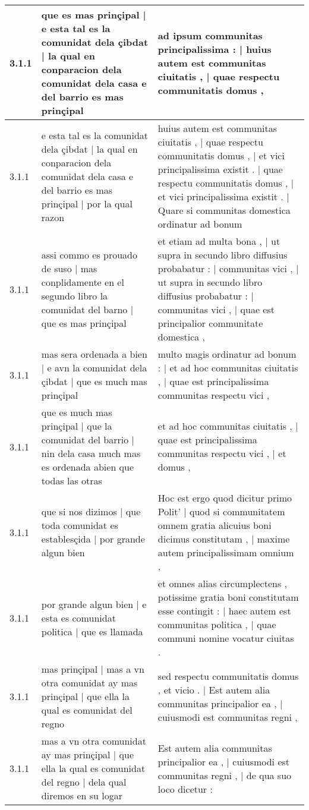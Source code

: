 \begin{tabular}{|p{1cm}|p{6.5cm}|p{6.5cm}|}
3.1.1 & que es mas prinçipal | e esta tal es la comunidat dela çibdat | la qual en conparacion dela comunidat dela casa e del barrio es mas prinçipal & ad ipsum communitas principalissima : | huius autem est communitas ciuitatis , | quae respectu communitatis domus , \\\hline
3.1.1 & e esta tal es la comunidat dela çibdat | la qual en conparacion dela comunidat dela casa e del barrio es mas prinçipal | por la qual razon & huius autem est communitas ciuitatis , | quae respectu communitatis domus , | et vici principalissima existit . | quae respectu communitatis domus , | et vici principalissima existit . | Quare si communitas domestica ordinatur ad bonum \\\hline
3.1.1 & assi commo es prouado de suso | mas conplidamente en el segundo libro la comunidat del barno | que es mas prinçipal & et etiam ad multa bona , | ut supra in secundo libro diffusius probabatur : | communitas vici , | ut supra in secundo libro diffusius probabatur : | communitas vici , | quae est principalior communitate domestica , \\\hline
3.1.1 & mas sera ordenada a bien | e avn la comunidat dela çibdat | que es much mas prinçipal & multo magis ordinatur ad bonum : | et ad hoc communitas ciuitatis , | quae est principalissima communitas respectu vici , \\\hline
3.1.1 & que es much mas prinçipal | que la comunidat del barrio | nin dela casa much mas es ordenada abien que todas las otras & et ad hoc communitas ciuitatis , | quae est principalissima communitas respectu vici , | et domus , \\\hline
3.1.1 & que si nos dizimos | que toda comunidat es establesçida | por grande algun bien & Hoc est ergo quod dicitur primo Polit’ | quod si communitatem omnem gratia alicuius boni dicimus constitutam , | maxime autem principalissimam omnium , \\\hline
3.1.1 & por grande algun bien | e esta es comunidat politica | que es llamada & et omnes alias circumplectens , potissime gratia boni constitutam esse contingit : | haec autem est communitas politica , | quae communi nomine vocatur ciuitas . \\\hline
3.1.1 & mas prinçipal | mas a vn otra comunidat ay mas prinçipal | que ella la qual es comunidat del regno & sed respectu communitatis domus , et vicio . | Est autem alia communitas principalior ea , | cuiusmodi est communitas regni , \\\hline
3.1.1 & mas a vn otra comunidat ay mas prinçipal | que ella la qual es comunidat del regno | dela qual diremos en su logar & Est autem alia communitas principalior ea , | cuiusmodi est communitas regni , | de qua suo loco dicetur : \\\hline

\end{tabular}
